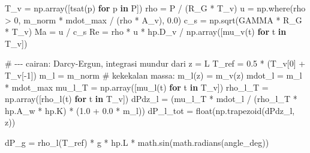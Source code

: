 \documentclass[
  indonesian,
  12pt,
  a4paper,
]{report}
\newenvironment{Shaded}{\begin{snugshade}}{\end{snugshade}}
\newcommand{\BuiltInTok}[1]{\textcolor[rgb]{0.00,0.23,0.31}{#1}}
\newcommand{\CommentTok}[1]{\textcolor[rgb]{0.37,0.37,0.37}{#1}}
\newcommand{\ControlFlowTok}[1]{\textcolor[rgb]{0.00,0.23,0.31}{\textbf{#1}}}
\newcommand{\DecValTok}[1]{\textcolor[rgb]{0.68,0.00,0.00}{#1}}
\newcommand{\FloatTok}[1]{\textcolor[rgb]{0.68,0.00,0.00}{#1}}
\newcommand{\KeywordTok}[1]{\textcolor[rgb]{0.00,0.23,0.31}{\textbf{#1}}}
\newcommand{\NormalTok}[1]{\textcolor[rgb]{0.00,0.23,0.31}{#1}}
\newcommand{\OperatorTok}[1]{\textcolor[rgb]{0.37,0.37,0.37}{#1}}
\begin{document}
\begin{Shaded}
\begin{Highlighting}[]
\NormalTok{    T\_v }\OperatorTok{=}\NormalTok{ np.array([tsat(p) }\ControlFlowTok{for}\NormalTok{ p }\KeywordTok{in}\NormalTok{ P])}
\NormalTok{    rho }\OperatorTok{=}\NormalTok{ P }\OperatorTok{/}\NormalTok{ (R\_G }\OperatorTok{*}\NormalTok{ T\_v)}
\NormalTok{    u }\OperatorTok{=}\NormalTok{ np.where(rho }\OperatorTok{\textgreater{}} \DecValTok{0}\NormalTok{, m\_norm }\OperatorTok{*}\NormalTok{ mdot\_max }\OperatorTok{/}\NormalTok{ (rho }\OperatorTok{*}\NormalTok{ A\_v), }\FloatTok{0.0}\NormalTok{)}
\NormalTok{    c\_s }\OperatorTok{=}\NormalTok{ np.sqrt(GAMMA }\OperatorTok{*}\NormalTok{ R\_G }\OperatorTok{*}\NormalTok{ T\_v)}
\NormalTok{    Ma }\OperatorTok{=}\NormalTok{ u }\OperatorTok{/}\NormalTok{ c\_s}
\NormalTok{    Re }\OperatorTok{=}\NormalTok{ rho }\OperatorTok{*}\NormalTok{ u }\OperatorTok{*}\NormalTok{ hp.D\_v }\OperatorTok{/}\NormalTok{ np.array([mu\_v(t) }\ControlFlowTok{for}\NormalTok{ t }\KeywordTok{in}\NormalTok{ T\_v])}

    \CommentTok{\# {-}{-}{-} cairan: Darcy{-}Ergun, integrasi mundur dari z = L}
\NormalTok{    T\_ref }\OperatorTok{=} \FloatTok{0.5} \OperatorTok{*}\NormalTok{ (T\_v[}\DecValTok{0}\NormalTok{] }\OperatorTok{+}\NormalTok{ T\_v[}\OperatorTok{{-}}\DecValTok{1}\NormalTok{])}
\NormalTok{    m\_l }\OperatorTok{=}\NormalTok{ m\_norm  }\CommentTok{\# kekekalan massa: m\_l(z) = m\_v(z)}
\NormalTok{    mdot\_l }\OperatorTok{=}\NormalTok{ m\_l }\OperatorTok{*}\NormalTok{ mdot\_max}
\NormalTok{    mu\_l\_T }\OperatorTok{=}\NormalTok{ np.array([mu\_l(t) }\ControlFlowTok{for}\NormalTok{ t }\KeywordTok{in}\NormalTok{ T\_v])}
\NormalTok{    rho\_l\_T }\OperatorTok{=}\NormalTok{ np.array([rho\_l(t) }\ControlFlowTok{for}\NormalTok{ t }\KeywordTok{in}\NormalTok{ T\_v])}
\NormalTok{    dPdz\_l }\OperatorTok{=}\NormalTok{ (mu\_l\_T }\OperatorTok{*}\NormalTok{ mdot\_l }\OperatorTok{/}\NormalTok{ (rho\_l\_T }\OperatorTok{*}\NormalTok{ hp.A\_w }\OperatorTok{*}\NormalTok{ hp.K)}
              \OperatorTok{*}\NormalTok{ (}\FloatTok{1.0} \OperatorTok{+} \FloatTok{0.0} \OperatorTok{*}\NormalTok{ m\_l))}
\NormalTok{    dP\_l\_tot }\OperatorTok{=} \BuiltInTok{float}\NormalTok{(np.trapezoid(dPdz\_l, z))}

\NormalTok{    dP\_g }\OperatorTok{=}\NormalTok{ rho\_l(T\_ref) }\OperatorTok{*}\NormalTok{ g }\OperatorTok{*}\NormalTok{ hp.L }\OperatorTok{*}\NormalTok{ math.sin(math.radians(angle\_deg))}


\end{Highlighting}
\end{Shaded}
\end{document}

